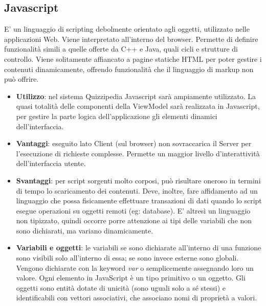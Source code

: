 	\subsection{Javascript}
	E' un linguaggio di scripting debolmente orientato agli oggetti, utilizzato nelle applicazioni
Web. Viene interpretato all'interno del browser. Permette di definire funzionalità simili a
quelle offerte da C++ e Java, quali cicli e strutture di controllo.
Viene solitamente affiancato a pagine statiche HTML per poter gestire i contenuti dinamicamente, offrendo funzionalità che il linguaggio di markup non può offrire.
	\begin{itemize}
		\item\textbf{Utilizzo}: nel sistema Quizzipedia Javascript sarà ampiamente utilizzato. La quasi totalità delle componenti della ViewModel sarà realizzata in Javascript, per gestire la parte logica dell'applicazione gli elementi dinamici dell'interfaccia.
		\item\textbf{Vantaggi}: eseguito lato Client (sul browser) non sovraccarica il Server per l'esecuzione di richieste complesse. Permette un maggior livello d'interattività dell'interfaccia utente.
		\item\textbf{Svantaggi}: per script sorgenti molto corposi, può risultare oneroso in termini di
tempo lo scaricamento dei contenuti. Deve, inoltre, fare affidamento ad un linguaggio
che possa fisicamente effettuare transazioni di dati quando lo script esegue operazioni
su oggetti remoti (eg: database).
E' altresì un linguaggio non tipizzato, quindi occorre porre attenzione ai tipi delle
variabili che non sono dichiarati, ma variano dinamicamente.
		\item\textbf{Variabili e oggetti}: le variabili se sono dichiarate all'interno di una funzione sono
visibili solo all'interno di essa; se sono invece esterne sono globali. Vengono dichiarate
con la keyword \emph{var} o semplicemente assegnando loro un valore.
Ogni elemento in JavaScript è un tipo primitivo o un oggetto.
Gli oggetti sono entità dotate di unicità (sono uguali solo a sé stessi) e identificabili
con vettori associativi, che associano nomi di proprietà a valori.
	\end{itemize}
